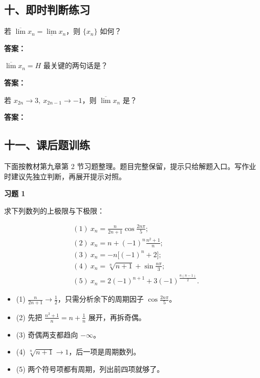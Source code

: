 \subsection*{十、即时判断练习}

\begin{quickcheck}
若 \(\overline{\lim}x_n=\underline{\lim}x_n\)，则 \(\{x_n\}\) 如何？

\tcblower
\textbf{答案：}
\end{quickcheck}

\begin{quickcheck}
\(\overline{\lim}x_n=H\) 最关键的两句话是？

\tcblower
\textbf{答案：}
\end{quickcheck}

\begin{quickcheck}
若 \(x_{2n}\to 3,\ x_{2n-1}\to -1\)，则 \(\overline{\lim}x_n\) 是？

\tcblower
\textbf{答案：}
\end{quickcheck}

\subsection*{十一、课后题训练}

下面按教材第九章第 2 节习题整理。题目完整保留，提示只给解题入口。写作业时建议先独立判断，再展开提示对照。

\begin{exercisebox}
\textbf{习题 1 }

求下列数列的上极限与下极限：

\[
      \begin{aligned}
      &(1)\ x_n=\frac{n}{2n+1}\cos\frac{2n\pi}{5};\\
      &(2)\ x_n=n+(-1)^n\frac{n^2+1}{n};\\
      &(3)\ x_n=-n\bigl[(-1)^n+2\bigr];\\
      &(4)\ x_n=\sqrt[n]{n+1}+\sin\frac{n\pi}{3};\\
      &(5)\ x_n=2(-1)^{n+1}+3(-1)^{\frac{n(n-1)}2}.
      \end{aligned}
      \]

\begin{hintbox}
\begin{itemize}
 \item (1) \(\frac{n}{2n+1}\to \frac12\)，只需分析余下的周期因子 \(\cos\frac{2n\pi}{5}\)。
 \item (2) 先把 \(\frac{n^2+1}{n}=n+\frac1n\) 展开，再拆奇偶。
 \item (3) 奇偶两支都趋向 \(-\infty\)。
 \item (4) \(\sqrt[n]{n+1}\to1\)，后一项是周期数列。
 \item (5) 两个符号项都有周期，列出前四项就够了。
 \end{itemize}
\end{hintbox}
\end{exercisebox}

